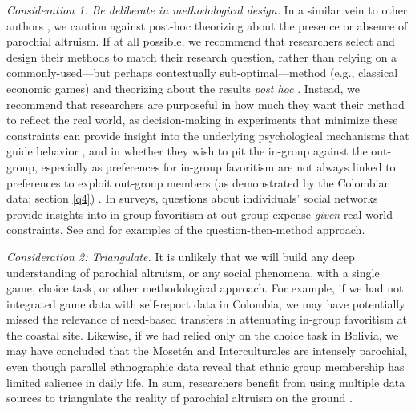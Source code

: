 \documentclass[bibauthoryear]{aa}
\begin{document}
\emph{Consideration 1: Be deliberate in methodological design.} In a similar vein to other authors \citep[e.g.,][]{hagen2006game, guala2012reciprocity}, we caution against post-hoc theorizing about the presence or absence of parochial altruism. If at all possible, we recommend that researchers select and design their methods to match their research question, rather than relying on a commonly-used---but perhaps contextually sub-optimal---method (e.g., classical economic games) and theorizing about the results \emph{post hoc} \citep{Pisor2020}. Instead, we recommend that researchers are purposeful in how much they want their method to reflect the real world, as decision-making in experiments that minimize these constraints can provide insight into the underlying psychological mechanisms that guide behavior \citep{Pisor2020}, and in whether they wish to pit the in-group against the out-group, especially as preferences for in-group favoritism are not always linked to preferences to exploit out-group members (as demonstrated by the Colombian data; section \ref{q4}) \citep{brewer2006evolutionary, cashdan2001ethnocentrism, hruschka2013economic, purzycki2019identity, schaub2017threat, yamagishi2013behavioral}. In surveys, questions about individuals' social networks provide insights into in-group favoritism at out-group expense \emph{given} real-world constraints. See \citet{schaub2017threat} and \citet{yamagishi2016parochial} for examples of the question-then-method approach.

\emph{Consideration 2: Triangulate.} It is unlikely that we will build any deep understanding of parochial altruism, or any social phenomena, with a single game, choice task, or other methodological approach. For example, if we had not integrated game data with self-report data in Colombia, we may have potentially missed the relevance of need-based transfers in attenuating in-group favoritism at the coastal site. Likewise, if we had relied only on the choice task in Bolivia, we may have concluded that the Moset\'en and Interculturales are intensely parochial, even though parallel ethnographic data reveal that ethnic group membership has limited salience in daily life. In sum, researchers benefit from using multiple data sources to triangulate the reality of parochial altruism on the ground \citep{Friedman2004, Pisor2020, Naar2020, gurven2008collective}. %
\end{document}
